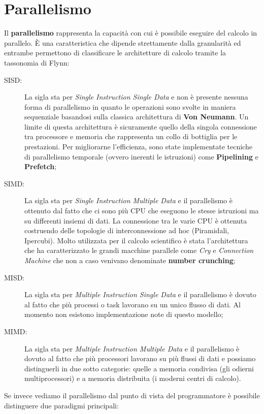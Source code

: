 \section{Parallelismo}
Il \textbf{parallelismo} rappresenta la capacità con cui è possibile eseguire del calcolo in parallelo. È una caratteristica che dipende strettamente dalla granularità ed entrambe permettono di classificare le architetture di calcolo tramite la tassonomia di Flynn:
\begin{description}
  \item[SISD:] La sigla sta per \textit{Single Instruction Single Data} e non è presente nessuna forma di parallelismo in quanto le operazioni sono svolte in maniera sequenziale basandosi sulla classica architettura di \textbf{Von Neumann}. Un limite di questa architettura è sicuramente quello della singola connessione tra processore e memoria che rappresenta un collo di bottiglia per le prestazioni. Per migliorarne l'efficienza, sono state implementate tecniche di parallelismo temporale (ovvero inerenti le istruzioni) come \textbf{Pipelining} e \textbf{Prefetch};
  \item[SIMD:] La sigla sta per \textit{Single Instruction Multiple Data} e il parallelismo è ottenuto dal fatto che ci sono più CPU che eseguono le stesse istruzioni ma su differenti insiemi di dati. La connessione tra le varie CPU è ottenuta costruendo delle topologie di interconnessione ad hoc (Piramidali, Ipercubi). Molto utilizzata per il calcolo scientifico è stata l'architettura che ha caratterizzato le grandi macchine parallele come \textit{Cry} e \textit{Connection Machine} che non a caso venivano denominate \textbf{number crunching};
  \item[MISD:] La sigla sta per \textit{Multiple Instruction Single Data} e il parallelismo è dovuto al fatto che più processi o task lavorano su un unico flusso di dati. Al momento non esistono implementazione note di questo modello;
  \item[MIMD:] La sigla sta per \textit{Multiple Instruction Multiple Data} e il parallelismo è dovuto al fatto che più processori lavorano su più flussi di dati e possiamo distinguerli in due sotto categorie: quelle a memoria condivisa (gli odierni multiprocessori) e a memoria distribuita (i moderni centri di calcolo).
\end{description}
Se invece vediamo il parallelismo dal punto di vista del programmatore è possibile distinguere due paradigmi principali:
